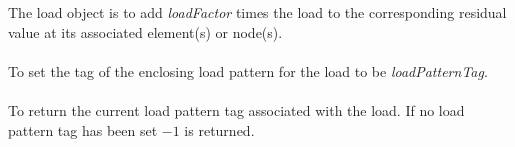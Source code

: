  \\
 \\
The load object is to add {\em loadFactor} times the load to the
corresponding residual value at its associated element(s) or node(s). \\

\\
To set the tag of the enclosing load pattern for the load to be 
{\em loadPatternTag}. \\

\\
To return the current load pattern tag associated with the load. If no
load pattern tag has been set $-1$ is returned.

